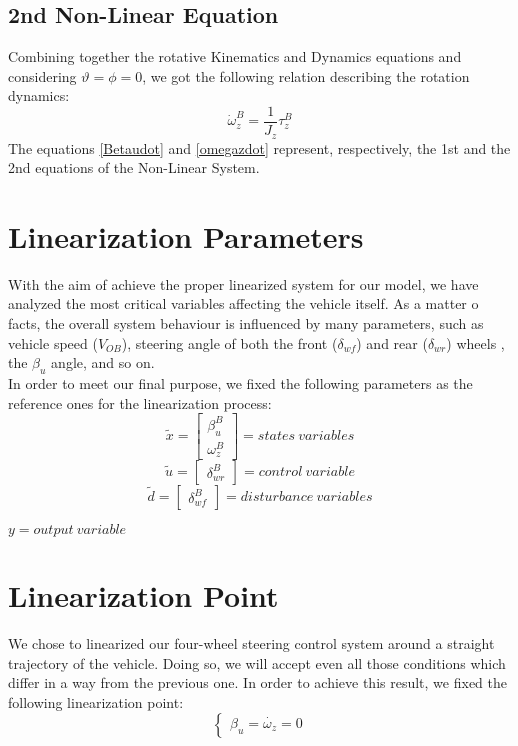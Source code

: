 \subsection{2nd Non-Linear Equation}
	Combining together the rotative Kinematics and Dynamics equations and considering $\vartheta = \phi = 0$, we got the following relation describing the rotation dynamics:
	\begin{equation} \label{omegazdot}
		\dot{\omega}_{z}^{B} = \frac{1}{J_{z}} \tau_{z}^{B}
	\end{equation}
	The equations \ref{Betaudot} and \ref{omegazdot} represent, respectively, the 1st and the 2nd equations of the Non-Linear System.
\section{Linearization Parameters} 
	With the aim of achieve the proper linearized system for our model, we have analyzed the most critical variables affecting the vehicle itself. As a matter o facts, the overall system behaviour is influenced by many parameters, such as vehicle speed ($V_{OB}$), steering angle of both the front ($\delta_{wf}$) and rear ($\delta_{wr}$) wheels , the $\beta_{u}$ angle, and so on. \\
	In order to meet our final purpose, we fixed the following parameters as the reference ones for the linearization process:\\
		\begin{equation*}
			\tilde{x} =
			\begin{bmatrix}
			\beta_{u}^{B} \\\omega_{z}^{B}
			\end{bmatrix} = states \ variables
		\end{equation*}\quad
		\begin{equation*} 
			\tilde{u} =
			\begin{bmatrix}
			\delta_{wr}^{B} 
			\end{bmatrix} = control \ variable
		\end{equation*}\quad
		\begin{equation*} 
			\tilde{d} =
			\begin{bmatrix}
			\delta_{wf}^{B} 
			\end{bmatrix} = disturbance \ variables
		\end{equation*}
		\begin{center}
			$ y = output \ variable $	
		\end{center}
\section{Linearization Point} 
	We chose to linearized our four-wheel steering control system around a straight trajectory of the vehicle. Doing so, we will accept even all those conditions which differ in a way from the previous one. In order to achieve this result, we fixed the following linearization point:
		\begin{equation*}
			\begin{cases}
			\beta_{u} = \dot{\omega_{z}} = 0
			\end{cases}
		\end{equation*}
